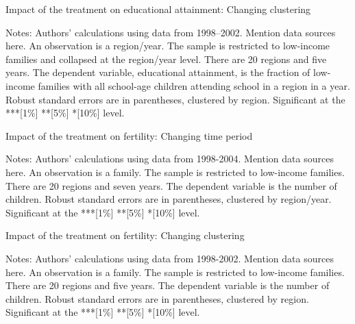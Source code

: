 \documentclass[12pt,a4paper]{article}
\begin{document}
\begin{footnotesize}
\begin{table}[H]
   \centering
   \caption{Impact of the treatment on educational attainment: Changing clustering} \label{tab:table3}
   \begin{threeparttable}
         \footnotesize 
     
        \begin{tablenotes}
        \scriptsize 
        \item{Notes: Authors’ calculations using data from 1998--2002. Mention data sources here. An observation is a region/year. The sample is restricted to low-income families and collapsed at the region/year level. There are 20 regions and five years. The dependent variable, educational attainment, is the fraction of low-income families with all school-age children attending school in a region in a year. Robust standard errors are in parentheses, clustered by region. Significant at the ***[1\%] **[5\%] *[10\%] level.
}
        \end{tablenotes}  
   \end{threeparttable}                          
\end{table}


\begin{table}[H]
   \centering
   \caption{Impact of the treatment on fertility: Changing time period} \label{tab:table4}
   \begin{threeparttable}
         \footnotesize 
     
        \begin{tablenotes}
        \scriptsize 
        \item{Notes: Authors’ calculations using data from 1998-2004. Mention data sources here. An observation is a family. The sample is restricted to low-income families. There are 20 regions and seven years. The dependent variable is the number of children. Robust standard errors are in parentheses, clustered by region/year. Significant at the ***[1\%] **[5\%] *[10\%] level.
}
        \end{tablenotes}  
   \end{threeparttable}                          
\end{table}

\begin{table}[H]
   \centering
   \caption{Impact of the treatment on fertility: Changing clustering} \label{tab:table5}
   \begin{threeparttable}
         \footnotesize 
     
        \begin{tablenotes}
        \scriptsize 
        \item{Notes: Authors’ calculations using data from 1998-2002. Mention data sources here. An observation is a family. The sample is restricted to low-income families. There are 20 regions and five years. The dependent variable is the number of children. Robust standard errors are in parentheses, clustered by region. Significant at the ***[1\%] **[5\%] *[10\%] level.
}
        \end{tablenotes}  
   \end{threeparttable}                          
\end{table}



\end{footnotesize}
\end{document}

